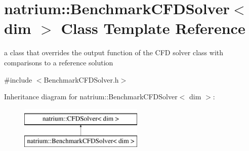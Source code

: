 \hypertarget{classnatrium_1_1BenchmarkCFDSolver}{\section{natrium\-:\-:Benchmark\-C\-F\-D\-Solver$<$ dim $>$ Class Template Reference}
\label{classnatrium_1_1BenchmarkCFDSolver}
}


a class that overrides the output function of the C\-F\-D solver class with comparisons to a reference solution  




{\ttfamily \#include $<$Benchmark\-C\-F\-D\-Solver.\-h$>$}

Inheritance diagram for natrium\-:\-:Benchmark\-C\-F\-D\-Solver$<$ dim $>$\-:\begin{figure}[H]
\begin{center}
\leavevmode
\includegraphics[height=2.000000cm]{classnatrium_1_1BenchmarkCFDSolver}
\end{center}
\end{figure}
